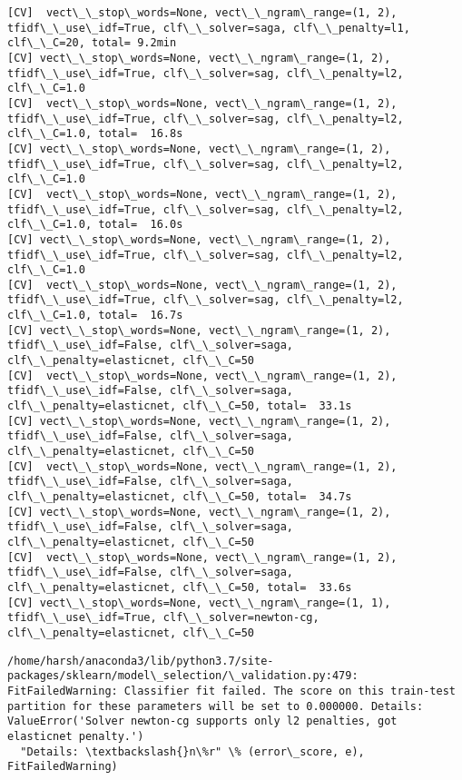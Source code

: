 \documentclass[11pt]{article}
\begin{document}
    \begin{Verbatim}[commandchars=\\\{\}]
[CV]  vect\_\_stop\_words=None, vect\_\_ngram\_range=(1, 2), tfidf\_\_use\_idf=True, clf\_\_solver=saga, clf\_\_penalty=l1, clf\_\_C=20, total= 9.2min
[CV] vect\_\_stop\_words=None, vect\_\_ngram\_range=(1, 2), tfidf\_\_use\_idf=True, clf\_\_solver=sag, clf\_\_penalty=l2, clf\_\_C=1.0 
[CV]  vect\_\_stop\_words=None, vect\_\_ngram\_range=(1, 2), tfidf\_\_use\_idf=True, clf\_\_solver=sag, clf\_\_penalty=l2, clf\_\_C=1.0, total=  16.8s
[CV] vect\_\_stop\_words=None, vect\_\_ngram\_range=(1, 2), tfidf\_\_use\_idf=True, clf\_\_solver=sag, clf\_\_penalty=l2, clf\_\_C=1.0 
[CV]  vect\_\_stop\_words=None, vect\_\_ngram\_range=(1, 2), tfidf\_\_use\_idf=True, clf\_\_solver=sag, clf\_\_penalty=l2, clf\_\_C=1.0, total=  16.0s
[CV] vect\_\_stop\_words=None, vect\_\_ngram\_range=(1, 2), tfidf\_\_use\_idf=True, clf\_\_solver=sag, clf\_\_penalty=l2, clf\_\_C=1.0 
[CV]  vect\_\_stop\_words=None, vect\_\_ngram\_range=(1, 2), tfidf\_\_use\_idf=True, clf\_\_solver=sag, clf\_\_penalty=l2, clf\_\_C=1.0, total=  16.7s
[CV] vect\_\_stop\_words=None, vect\_\_ngram\_range=(1, 2), tfidf\_\_use\_idf=False, clf\_\_solver=saga, clf\_\_penalty=elasticnet, clf\_\_C=50 
[CV]  vect\_\_stop\_words=None, vect\_\_ngram\_range=(1, 2), tfidf\_\_use\_idf=False, clf\_\_solver=saga, clf\_\_penalty=elasticnet, clf\_\_C=50, total=  33.1s
[CV] vect\_\_stop\_words=None, vect\_\_ngram\_range=(1, 2), tfidf\_\_use\_idf=False, clf\_\_solver=saga, clf\_\_penalty=elasticnet, clf\_\_C=50 
[CV]  vect\_\_stop\_words=None, vect\_\_ngram\_range=(1, 2), tfidf\_\_use\_idf=False, clf\_\_solver=saga, clf\_\_penalty=elasticnet, clf\_\_C=50, total=  34.7s
[CV] vect\_\_stop\_words=None, vect\_\_ngram\_range=(1, 2), tfidf\_\_use\_idf=False, clf\_\_solver=saga, clf\_\_penalty=elasticnet, clf\_\_C=50 
[CV]  vect\_\_stop\_words=None, vect\_\_ngram\_range=(1, 2), tfidf\_\_use\_idf=False, clf\_\_solver=saga, clf\_\_penalty=elasticnet, clf\_\_C=50, total=  33.6s
[CV] vect\_\_stop\_words=None, vect\_\_ngram\_range=(1, 1), tfidf\_\_use\_idf=True, clf\_\_solver=newton-cg, clf\_\_penalty=elasticnet, clf\_\_C=50 

    \end{Verbatim}

    \begin{Verbatim}[commandchars=\\\{\}]
/home/harsh/anaconda3/lib/python3.7/site-packages/sklearn/model\_selection/\_validation.py:479: FitFailedWarning: Classifier fit failed. The score on this train-test partition for these parameters will be set to 0.000000. Details: 
ValueError('Solver newton-cg supports only l2 penalties, got elasticnet penalty.')
  "Details: \textbackslash{}n\%r" \% (error\_score, e), FitFailedWarning)

    \end{Verbatim}
\end{document}
